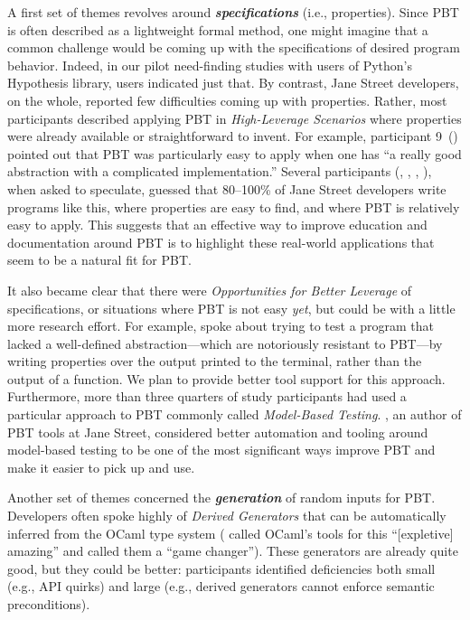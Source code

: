 \newcommand{\proptheme}[1]{{\color{nord-orange} \em #1}}
\newcommand{\gentheme}[1]{{\color{nord-green} \em #1}}
\newcommand{\evaltheme}[1]{{\color{nord-purple} \em #1}}
\newcommand{\edutheme}[1]{{\color{nord-frost4} \em #1}}
A first set of
themes revolves around \proptheme{\normalfont \bf specifications} (i.e.,
properties).
Since
PBT is often described as a lightweight formal method, one
might imagine that a common challenge would be coming up with the
specifications of desired program behavior. Indeed, in our pilot need-finding
studies with users of Python's Hypothesis library, users indicated just that.
By contrast, Jane Street developers, on the whole, reported
few difficulties coming up with
properties. Rather, most participants described applying PBT in
\proptheme{High-Leverage Scenarios} where properties were already
available or straightforward to invent. For example, participant
9~() pointed out that PBT was particularly easy to apply when one
has ``a really good abstraction
with a complicated implementation.''
Several participants (, ,
, ), when asked to speculate, guessed
that 80--100\% of Jane Street
developers write programs like this, where properties are easy to find, and
where PBT is relatively easy to apply.  This suggests that an effective way to
improve education and documentation around PBT is to highlight these real-world
applications that seem to be a natural fit for PBT.

It also became clear that there were \proptheme{Opportunities for Better
Leverage} of specifications, or situations where PBT is not easy {\em yet}, but
could be with a
little more research effort. For example,  spoke about trying to
test a program that lacked a well-defined abstraction---which are notoriously
resistant to PBT---by
writing properties over the output printed to the terminal, rather than the
output of a function. We plan to provide better tool support for this approach.
Furthermore, more than three quarters of study participants had used a
particular approach to PBT commonly called
\proptheme{Model-Based Testing}.
, an author of PBT tools at Jane Street, considered better
automation and tooling around model-based testing to be one of the most
significant ways improve PBT and make it easier to pick up and use.

Another set of themes concerned the \gentheme{\normalfont \bf generation} of
random inputs for PBT. Developers often spoke
highly of \gentheme{Derived Generators} that can be automatically inferred from
the OCaml type system ( called OCaml's tools for this
``[expletive] amazing'' and  called them a ``game changer'').
These generators are already quite good, but they could be better: participants
identified deficiencies both small (e.g., API quirks) and large (e.g.,
derived generators
cannot enforce semantic preconditions).

